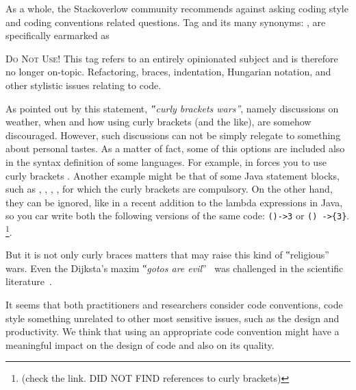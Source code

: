 As a whole, the Stackoverlow community
recommends against asking coding style and coding conventions related questions.
Tag  and its many synonyms: ,
 are specifically
earmarked as

\begin{tcolorbox}[colback=green!5!white,colframe=blue!25!white,notitle]
    \textsc{Do Not Use!}
This tag refers to an entirely opinionated subject and is therefore
no longer on-topic. Refactoring, braces, indentation, Hungarian notation, and
other stylistic issues relating to code.
\end{tcolorbox}

As pointed out by this statement, \emph{‟curly brackets wars”}, namely discussions
on weather, when and how using curly brackets (and the like), are somehow discouraged.
However, such discussions can not be simply relegate to something about personal
tastes.
As a matter of fact, some of this options are included also in the syntax definition of some languages.
For example, in \Go forces you to use curly brackets .
Another example might be that of some Java statement blocks, such as , , ,
, for which the curly brackets are compulsory.
On the other hand, they can be ignored, like in a recent addition to
the lambda expressions 
in Java, so you car write both the following versions of the same code: \texttt{()->3} or \texttt{() ->\{3\}}.
\matteo\footnote{(check the link. DID NOT FIND references to curly brackets)}.
%

But it is not only curly braces matters that may raise
this kind of ‟religious” wars. Even the Dijksta's maxim ‟\emph{gotos
are evil}”~\cite{Dijkstra:1968} was challenged in the scientific
literature~\cite{Knuth:1974,Ramshaw:1988,Bochmann:1973,Sennesh:Gil:2016,Zoethout:1979,Wulf:1979,Clark:1984}.

It seems that both practitioners and researchers consider code conventions, code style
something unrelated to other most sensitive issues, such as the design and productivity.
We think that using an appropriate code convention might have a meaningful impact on the
design of code and also on its quality.

